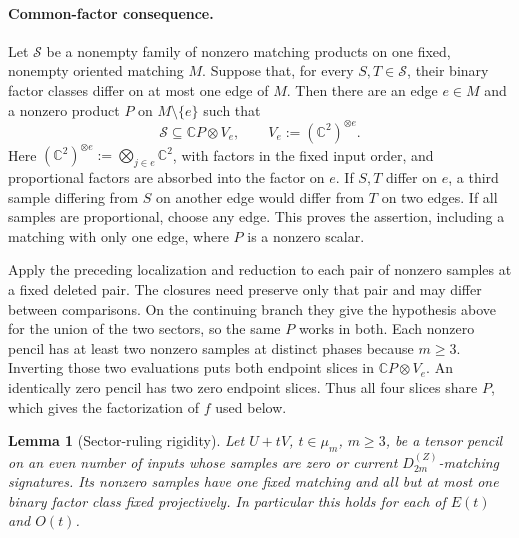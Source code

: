 \documentclass[11pt,letterpaper,onecolumn]{article}
\theoremstyle{plain}
\newtheorem{lemma}[lemma]{Lemma}
\theoremstyle{definition}
\theoremstyle{remark}
\newcommand{\DihZ}[1]{{D_{#1}^{(Z)}}}
\begin{document}
\paragraph{Common-factor consequence.}
\label{par:nd-common-factor-consequence}
Let \(\mathscr S\) be a nonempty family of nonzero matching products on
one fixed, nonempty oriented matching \(M\).  Suppose that, for every
\(S,T\in\mathscr S\), their binary factor classes differ on at most one
edge of \(M\).  Then there are an edge \(e\in M\) and a nonzero product
\(P\) on \(M\setminus\{e\}\) such that
\[
  \mathscr S\subseteq\mathbb C P\otimes V_e,
  \qquad V_e:=(\mathbb C^2)^{\otimes e}.
\]
Here \((\mathbb C^2)^{\otimes e}:=\bigotimes_{j\in e}\mathbb C^2\),
with factors in the fixed input order, and proportional
factors are absorbed into the factor on \(e\).  If \(S,T\) differ on
\(e\), a third sample differing from \(S\) on another edge would differ
from \(T\) on two edges.  If all samples are proportional, choose any
edge.  This proves the assertion, including a matching with only one edge,
where \(P\) is a nonzero scalar.

Apply the preceding localization and reduction to each pair of nonzero
samples at a fixed deleted pair.  The closures need preserve only that
pair and may differ between comparisons.  On the continuing branch they
give the hypothesis above for the union of the two sectors, so the same
\(P\) works in both.  Each nonzero pencil has at least two nonzero samples
at distinct phases because \(m\ge3\).  Inverting those two evaluations
puts both endpoint slices in \(\mathbb C P\otimes V_e\). An identically
zero pencil has two zero endpoint slices.  Thus all four slices share
\(P\), which gives the factorization of \(f\) used below.

\begin{lemma}[Sector-ruling rigidity]
\label{lem:app-nd-sector-ruling}
Let \(U+tV\), \(t\in\mu_m\), \(m\ge3\), be a tensor pencil on an
even number of inputs whose samples are zero or current
\(\DihZ{2m}\)-matching signatures.  Its nonzero samples have one fixed
matching and all but at most one binary factor class fixed projectively.
In particular this holds for each of \(E(t)\) and \(O(t)\).
\end{lemma}
\end{document}
